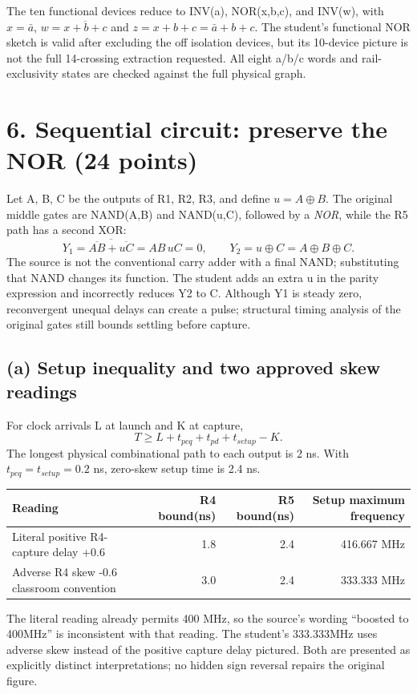 \documentclass[10pt]{article}
\begin{document}
The ten functional devices reduce to INV(a), NOR(x,b,c), and INV(w), with $x=\bar a$, $w=\overline{x+b+c}$ and $z=x+b+c=\bar a+b+c$. The student's functional NOR sketch is valid after excluding the off isolation devices, but its 10-device picture is not the full 14-crossing extraction requested. All eight a/b/c words and rail-exclusivity states are checked against the full physical graph.

\newpage\section*{6. Sequential circuit: preserve the NOR (24 points)}
Let A, B, C be the outputs of R1, R2, R3, and define $u=A\oplus B$. The original middle gates are NAND(A,B) and NAND(u,C), followed by a \emph{NOR}, while the R5 path has a second XOR:
\[
Y_1=\overline{\overline{AB}+\overline{uC}}=AB\,uC=0,
\qquad Y_2=u\oplus C=A\oplus B\oplus C.
\]
The source is not the conventional carry adder with a final NAND; substituting that NAND changes its function. The student adds an extra u in the parity expression and incorrectly reduces Y2 to C. Although Y1 is steady zero, reconvergent unequal delays can create a pulse; structural timing analysis of the original gates still bounds settling before capture.

\subsection*{(a) Setup inequality and two approved skew readings}
For clock arrivals L at launch and K at capture,
\[T\ge L+t_{pcq}+t_{pd}+t_{setup}-K.\]
The longest physical combinational path to each output is 2 ns. With $t_{pcq}=t_{setup}=0.2$ ns, zero-skew setup time is 2.4 ns.
\begin{center}\begin{tabular}{lrrr}\toprule Reading&R4 bound(ns)&R5 bound(ns)&Setup maximum frequency\\\midrule
Literal positive R4-capture delay +0.6&1.8&2.4&416.667 MHz\\
Adverse R4 skew -0.6 classroom convention&3.0&2.4&333.333 MHz\\\bottomrule\end{tabular}\end{center}
The literal reading already permits 400 MHz, so the source's wording ``boosted to 400MHz'' is inconsistent with that reading. The student's 333.333MHz uses adverse skew instead of the positive capture delay pictured. Both are presented as explicitly distinct interpretations; no hidden sign reversal repairs the original figure.
\end{document}
